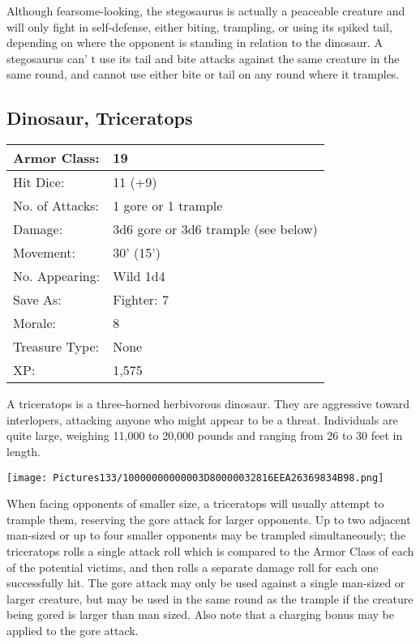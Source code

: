 \documentclass[a4paper,twoside,openany,10pt]{book}
\begin{document}
\begin{multicols}{2}
Although fearsome-looking, the stegosaurus is actually a peaceable creature and will only fight in self-defense, either biting, trampling, or using its spiked tail, depending on where the opponent is standing in relation to the dinosaur. A stegosaurus can' t use its tail and bite attacks against the same creature in the same round, and cannot use either bite or tail on any round where it tramples.

\subsection*{Dinosaur, Triceratops}\label{dinosaur-triceratops}

\begin{tabularx}{0.48\textwidth}{@{}lX@{}}
Armor Class: & 19 \\\hline
Hit Dice: & 11 (+9) \\\hline
No. of Attacks: & 1 gore or 1 trample \\\hline
Damage: & 3d6 gore or 3d6 trample (see below) \\\hline
Movement: & 30' (15') \\\hline
No. Appearing: & Wild 1d4 \\\hline
Save As: & Fighter: 7 \\\hline
Morale: & 8 \\\hline
Treasure Type: & None \\\hline
XP: & 1,575 \\\hline
\end{tabularx}\medskip

A triceratops is a three-horned herbivorous dinosaur. They are aggressive toward interlopers, attacking anyone who might appear to be a threat. Individuals are quite large, weighing 11,000 to 20,000 pounds and ranging from 26 to 30 feet in length.


\begin{center}
	\texttt{[image: Pictures133/10000000000003D80000032816EEA26369834B98.png]}
\end{center}

When facing opponents of smaller size, a triceratops will usually attempt to trample them, reserving the gore attack for larger opponents. Up to two adjacent man-sized or up to four smaller opponents may be trampled simultaneously; the triceratops rolls a single attack roll which is compared to the Armor Class of each of the potential victims, and then rolls a separate damage roll for each one successfully hit. The gore attack may only be used against a single man-sized or larger creature, but may be used in the same round as the trample if the creature being gored is larger than man sized. Also note that a charging bonus may be applied to the gore attack.



\end{multicols}
\end{document}
